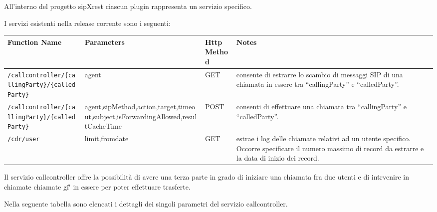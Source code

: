 All'interno del progetto sipXrest ciascun plugin rappresenta un servizio specifico. 

I servizi esistenti nella release corrente sono i seguenti:


\begin{tabular}[c]{l | p{5cm} || l || p{5cm}}
Function Name & Parameters & Http Method & Notes \\
\hline \hline
\texttt{/callcontroller/\{callingParty\}/\{calledParty\}} & agent & GET & consente di estrarre lo scambio di messaggi SIP di una chiamata in essere tra ``callingParty'' e ``calledParty''. \\ \hline
\texttt{/callcontroller/\{callingParty\}/\{calledParty\}} & agent,sipMethod,action,target,timeout,subject,isForwardingAllowed,resultCacheTime & POST & consenti di effettuare una chiamata tra ``callingParty'' e ``calledParty''. \\ \hline
\texttt{/cdr/{user}} & limit,fromdate & GET & estrae i log delle chiamate relativi ad un utente specifico. Occorre specificare il numero massimo di record da estrarre e la data di inizio dei record. \\ \hline
\end{tabular}


Il servizio callcontroller offre la possibilit\`a di avere una terza parte in grado di iniziare una chiamata fra due utenti e di intrvenire in chiamate chiamate gi\`' in essere per poter effettuare trasferte.

Nella seguente tabella sono elencati i dettagli dei singoli parametri del servizio callcontroller.

